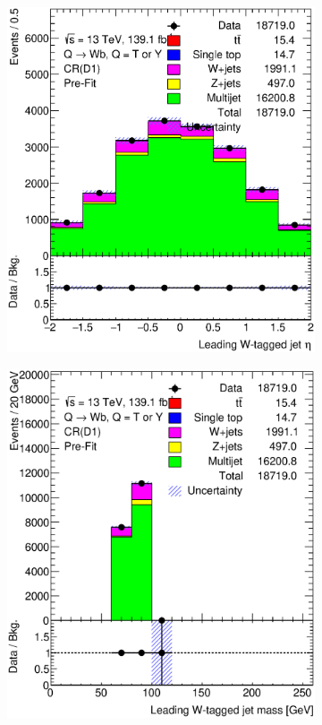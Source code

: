 \begin{figure}[hbt!]
\begin{subfigure}{.35\textwidth}
		\includegraphics[width=\linewidth,height=\textheight,keepaspectratio]{CR_D1_ljet_eta.eps}
		\caption{}
		\label{fig:app:cr_d1:ljet_eta}
	\end{subfigure}
	\begin{subfigure}{.35\textwidth}
		\centering
		\includegraphics[width=\linewidth,height=\textheight,keepaspectratio]{CR_D1_ljet_m.eps}

\end{subfigure}
\end{figure}
